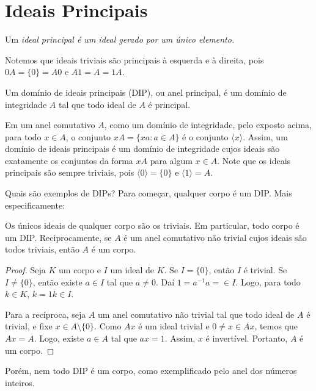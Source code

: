 \section{Ideais Principais}
\begin{definition}
    Um \em{ideal principal} é um ideal gerado por um único elemento.
\end{definition}

Notemos que ideais triviais são principais à esquerda e à direita, pois $0A=\{0\}=A0$ e $A1=A=1A$.

\begin{definition}
    Um domínio de ideais principais (DIP), ou anel principal, é um domínio de integridade $A$ tal que todo ideal de $A$ é principal.
\end{definition}

Em um anel comutativo $A$, como um domínio de integridade, pelo exposto acima, para todo $x \in A$, o conjunto $xA=\{xa: a \in A\}$ é o conjunto $\langle x\rangle$.
Assim, um domínio de ideais principais é um domínio de integridade cujos ideais são exatamente os conjuntos da forma $xA$ para algum $x \in A$. Note que os ideais principais são sempre triviais, pois $\langle 0\rangle=\{0\}$ e $\langle 1\rangle = A$.

Quais são exemplos de DIPs? Para começar, qualquer corpo é um DIP. Mais especificamente:

\begin{prop}
    Os únicos ideais de qualquer corpo são os triviais.
    Em particular, todo corpo é um DIP.
    Reciprocamente, se $A$ é um anel comutativo não trivial cujos ideais são todos triviais, então $A$ é um corpo.
\end{prop}
\begin{proof}
    Seja $K$ um corpo e $I$ um ideal de $K$.
    Se $I=\{0\}$, então $I$ é trivial.
    Se $I\neq \{0\}$, então existe $a \in I$ tal que $a \neq 0$. Daí $1=a^{-1}a=\in I$.
    Logo, para todo $k \in K$, $k=1k\in I$.

    Para a recíproca, seja $A$ um anel comutativo não trivial tal que todo ideal de $A$ é trivial, e fixe $x \in A\setminus \{0\}$.
    Como $Ax$ é um ideal trivial e $0\neq x \in Ax$, temos que $Ax=A$.
    Logo, existe $a \in A$ tal que $ax=1$. Assim, $x$ é invertível.
    Portanto, $A$ é um corpo.
\end{proof}

Porém, nem todo DIP é um corpo, como exemplificado pelo anel dos números inteiros.

